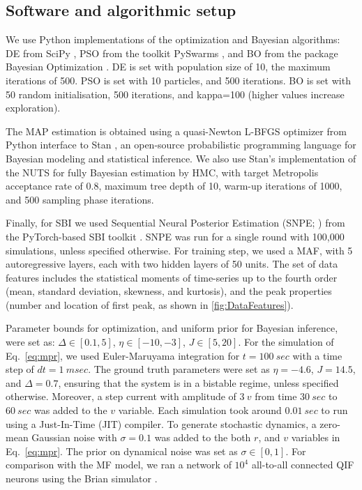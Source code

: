 \documentclass[preprint,11pt,authoryear]{elsarticle}
\begin{document}
\subsection{Software and algorithmic setup} 

We use Python implementations of the optimization and Bayesian algorithms: DE from SciPy \citep{Virtanen2020scipy}, PSO from the toolkit PySwarms \citep{Miranda2018pyswarms}, and BO from the package Bayesian Optimization \citep{Nogueira2014BO}. DE is set with population size of 10, the maximum iterations of 500. PSO is set with 10 particles, and 500 iterations. BO is set with 50 random initialisation, 500 iterations, and kappa=100 (higher values increase exploration).

The MAP estimation is obtained using a quasi-Newton L-BFGS optimizer from Python interface to Stan \citep{Carpenter2017}, an open-source probabilistic programming language for Bayesian modeling and statistical inference. We also use Stan's implementation of the NUTS for fully Bayesian estimation by HMC, with target Metropolis acceptance rate of 0.8, maximum tree depth of 10, warm-up iterations of 1000, and 500 sampling phase iterations. 

Finally, for SBI we used Sequential Neural Posterior Estimation (SNPE; \cite{Greenberg2019, Goncalves2020}) from the PyTorch-based SBI toolkit \citep{Tejero2020sbi}. SNPE was run for a single round with 100,000 simulations, unless specified otherwise. For training step, we used a MAF, with 5 autoregressive layers, each with two hidden layers of 50 units.
The set of data features includes the statistical moments of time-series up to the fourth order (mean, standard deviation, skewness, and kurtosis), and the peak properties (number and location of first peak, as shown in \autoref{fig:DataFeatures}).


Parameter bounds for optimization, and  uniform prior for Bayesian inference, were set as: $\Delta \in [0.1, 5]$, $\eta \in [-10, -3]$, $J \in [5, 20]$. For the simulation of Eq.~\ref{eq:mpr}, we used Euler-Maruyama integration for $t=100~sec$ with a time step of $dt=1~msec$. The ground truth parameters were set as $\eta=-4.6$, $J=14.5$, and $\Delta=0.7$, ensuring that the system is in a bistable regime, unless specified otherwise. Moreover, a step current with amplitude of $3~v$ from time $30~sec$ to $60~sec$ was added to the $v$ variable. Each simulation took around $0.01~sec$ to run using a Just-In-Time (JIT) compiler.
To generate stochastic dynamics, a zero-mean Gaussian noise with $\sigma=0.1$ was added to the both $r$, and $v$ variables in Eq.~\ref{eq:mpr}.  The prior on dynamical noise was set as $\sigma \in [0, 1]$.
For comparison with the MF model, we ran a network of $10^4$ all-to-all connected QIF neurons using the Brian simulator \citep{Stimberg2019}.
 
\end{document}
